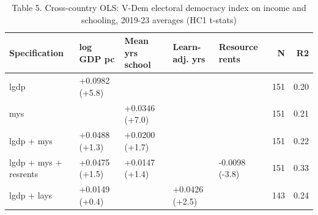 \begin{table}
\caption{Table 5. Cross-country OLS: V-Dem electoral democracy index on income and schooling, 2019-23 averages (HC1 t-stats)}
\label{tab:T5_crosssection}
\begin{tabular}{lllllrr}
\toprule
Specification & log GDP pc & Mean yrs school & Learn-adj. yrs & Resource rents & N & R2 \\
\midrule
lgdp & +0.0982 (+5.8) &  &  &  & 151 & 0.20 \\
mys &  & +0.0346 (+7.0) &  &  & 151 & 0.21 \\
lgdp + mys & +0.0488 (+1.3) & +0.0200 (+1.7) &  &  & 151 & 0.22 \\
lgdp + mys + resrents & +0.0475 (+1.5) & +0.0147 (+1.4) &  & -0.0098 (-3.8) & 151 & 0.33 \\
lgdp + lays & +0.0149 (+0.4) &  & +0.0426 (+2.5) &  & 143 & 0.24 \\
\bottomrule
\end{tabular}
\end{table}
